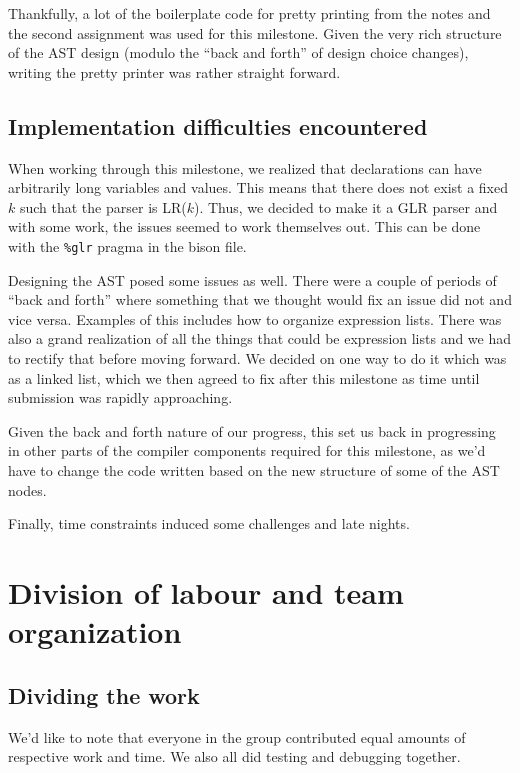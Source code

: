 \documentclass{article}
\begin{document}
Thankfully, a lot of the boilerplate code for pretty printing from the notes
and the second assignment was used for this milestone. Given the very rich
structure of the AST design (modulo the ``back and forth'' of design choice
changes), writing the pretty printer was rather straight forward.

\subsection{Implementation difficulties encountered}

When working through this milestone, we realized that declarations can have
arbitrarily long variables and values. This means that there does not exist
a fixed $k$ such that the parser is LR($k$). Thus, we decided to make it a GLR
parser and with some work, the issues seemed to work themselves out. This can
be done with the \verb|%glr| pragma in the bison file.

Designing the AST posed some issues as well. There were a couple of periods of
``back and forth'' where something that we thought would fix an issue did not
and vice versa. Examples of this includes how to organize expression lists.
There was also a grand realization of all the things that could be expression
lists and we had to rectify that before moving forward. We
decided on one way to do it which was as a linked list, which we then agreed to
fix after this milestone as time until submission was rapidly approaching.

Given the back and forth nature of our progress, this set us back in progressing
in other parts of the compiler components required for this milestone, as we'd
have to change the code written based on the new structure of some of
the AST nodes.

Finally, time constraints induced some challenges and late nights.

\section{Division of labour and team organization}

\subsection{Dividing the work}

We'd like to note that everyone in the group contributed equal amounts of
respective work and time. We also all did testing and debugging together.
\end{document}
